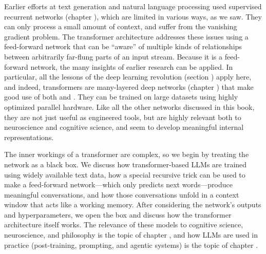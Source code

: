 
Earlier efforts at text generation and natural language processing used
supervised recurrent networks (chapter ), which
are limited in various ways, as we saw. They can only process a
small amount of context, and suffer from the vanishing gradient problem. The
transformer architecture addresses these issues using a feed-forward network that can
be ``aware'' of multiple kinds of relationships between arbitrarily far-flung
parts of an input stream. Because it is a feed-forward network, the many insights of earlier research 
can be applied. In
particular, all the lessons of the deep learning revolution (section
) apply here, and indeed, transformers are many-layered
deep networks (chapter ) that make good use of both
 and . They
can be trained on large datasets using highly optimized parallel hardware. Like
all the other networks discussed in this book, they are not just useful as
engineered tools, but are highly relevant both to neuroscience and cognitive
science, and seem to develop meaningful internal representations. 

The inner workings of a transformer are complex, so we begin by treating the
network as a black box. We discuss how transformer-based LLMs are trained using
widely available text data, how a special recursive trick can be used to make a
feed-forward network---which only predicts next words---produce meaningful
conversations, and how those conversations unfold in a context window that acts
like a working memory. After considering the network's outputs and
hyperparameters, we open the box and discuss how the transformer architecture
itself works. The relevance of these models to cognitive science, neuroscience,
and philosophy is the topic of chapter , and how LLMs are
used in practice (post-training, prompting, and agentic systems) is the topic of
chapter .


